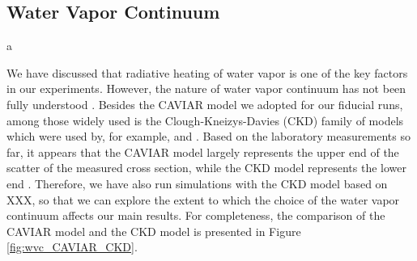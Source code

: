 \documentclass[11pt,numberedappendix,twocolappendix,]{emulateapj}
\begin{document}
{\bf 
\subsection{Water Vapor Continuum}
\label{ss:sensitivity_continuum}

a

We have discussed that radiative heating of water vapor is one of the key factors in our experiments. 
However, the nature of water vapor continuum has not been fully understood \citep[e.g.,][]{Shine2016,Campargue2016}. 
Besides the CAVIAR model we adopted for our fiducial runs, among those widely used is the Clough-Kneizys-Davies (CKD) family of models \citep{Clough1989,Clough2005} which were used by, for example,  \citet{Leconte2013a} and \citet{Wolf2014,Wolf2015}. 
Based on the laboratory measurements so far, it appears that the CAVIAR model largely represents the upper end of the scatter of the measured cross section, while the CKD model represents the lower end \citep[see][]{Shine2016}. 
Therefore, we have also run simulations with the CKD model based on XXX, so that we can explore the extent to which the choice of the water vapor continuum affects our main results. 
For completeness, the comparison of the CAVIAR model and the CKD model is presented in Figure \ref{fig:wvc_CAVIAR_CKD}. 

}
\end{document}

